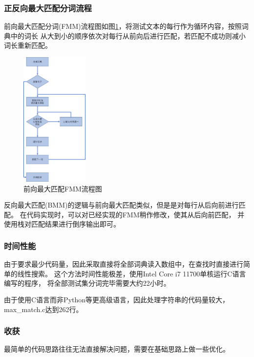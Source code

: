 \subsubsection{正反向最大匹配分词流程}

前向最大匹配分词(FMM)流程图如图\ref{fmm}，将测试文本的每行作为循环内容，按照词典中的词长
从大到小的顺序依次对每行从前向后进行匹配，若匹配不成功则减小词长重新匹配。

\begin{figure}[H]
  \centering
  \includegraphics[width=0.3\textwidth]{figures/figure_01.png}
  \caption{前向最大匹配FMM流程图}
  \label{fmm}
\end{figure}

反向最大匹配(BMM)的逻辑与前向最大匹配类似，但是是对每行从后向前进行匹配。
在代码实现时，可以对已经实现的FMM稍作修改，使其从后向前匹配，
并使用栈对匹配结果进行倒序输出即可。

\subsubsection{时间性能}

由于要求最少代码量，因此采取直接将全部词典读入数组中，在查找时直接进行简单的线性搜索。
这个方法时间性能极差，使用Intel Core i7 11700单核运行C语言编写的程序，
将全部测试集分词完毕需要大约22小时。

由于使用C语言而非Python等更高级语言，因此处理字符串的代码量较大，max\_match.c达到262行。

\subsubsection{收获}

最简单的代码思路往往无法直接解决问题，需要在基础思路上做一些优化。


